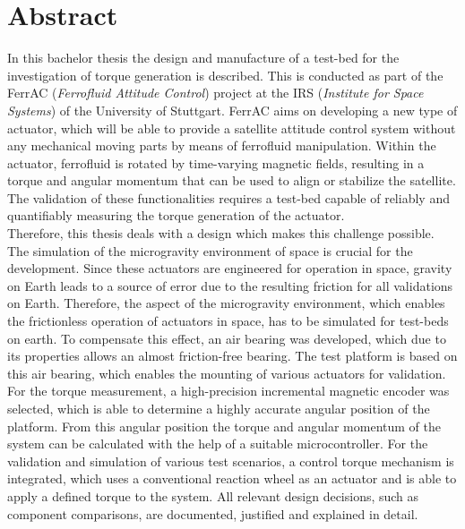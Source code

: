 \newpage

\chapter*{Abstract}
In this bachelor thesis the design and manufacture of a test-bed for the investigation of torque generation is described. This is conducted as part of the FerrAC (\textit{Ferrofluid Attitude Control}) project at the IRS (\textit{Institute for Space Systems}) of the University of Stuttgart. FerrAC aims on developing a new type of actuator, which will be able to provide a satellite attitude control system without any mechanical moving parts by means of ferrofluid manipulation. Within the actuator, ferrofluid is rotated by time-varying magnetic fields, resulting in a torque and angular momentum that can be used to align or stabilize the satellite. The validation of these functionalities requires a test-bed capable of reliably and quantifiably measuring the torque generation of the actuator.\\

Therefore, this thesis deals with a design which makes this challenge possible. The simulation of the microgravity environment of space is crucial for the development. Since these actuators are engineered for operation in space, gravity on Earth leads to a source of error due to the resulting friction for all validations on Earth. Therefore, the aspect of the microgravity environment, which enables the frictionless operation of actuators in space, has to be simulated for test-beds on earth. To compensate this effect, an air bearing was developed, which due to its properties allows an almost friction-free bearing. The test platform is based on this air bearing, which enables the mounting of various actuators for validation. For the torque measurement, a high-precision incremental magnetic encoder was selected, which is able to determine a highly accurate angular position of the platform. From this angular position the torque and angular momentum of the system can be calculated with the help of a suitable microcontroller. For the validation and simulation of various test scenarios, a control torque mechanism is integrated, which uses a conventional reaction wheel as an actuator and is able to apply a defined torque to the system. All relevant design decisions, such as component comparisons, are documented, justified and explained in detail.\\

